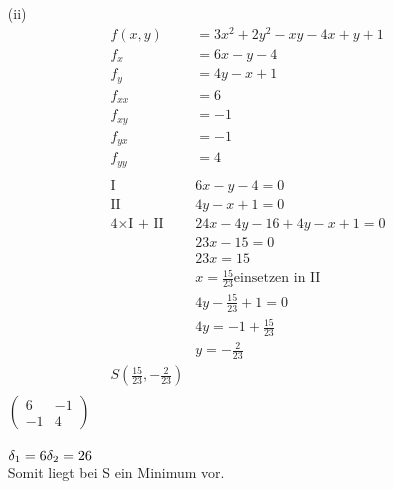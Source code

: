 \documentclass[a4paper,11pt,fleqn]{scrartcl}
\begin{document}
\begin{enumerate}
	 \item[(ii)]
	 \begin{align*}
	 	f(x,y)&=3x^2+2y^2-xy-4x+y+1\\
	 	f_{x}&=6x-y-4\\
	 	f_{y}&=4y-x+1\\
	 	f_{xx} &= 6\\
		f_{xy} &= -1\\
		f_{yx} &= -1\\
		f_{yy} &= 4\\\\
		\text{I }&6x-y-4=0\\
		\text{II }&4y-x+1=0\\
		\text{4}\times\text{I + II}&24x-4y-16+4y-x+1=0\\
		&23x-15=0\\
		&23x=15\\
		&x=\frac{15}{23}\text{einsetzen in II}\\
		&4y-\frac{15}{23}+1=0\\
		&4y=-1+\frac{15}{23}\\
		&y=-\frac{2}{23}\\
		S\left(\frac{15}{23},-\frac{2}{23}\right)\\
	 \end{align*}
	 $\left(\begin{matrix}
 		 6 & -1 \\
 		 -1 & 4
	 \end{matrix}\right)$\\\\
	 $ \delta_{1}=6\\ \delta_{2}=26$\\
	 Somit liegt bei S ein Minimum vor.\\
	 

\end{enumerate}
\end{document}
